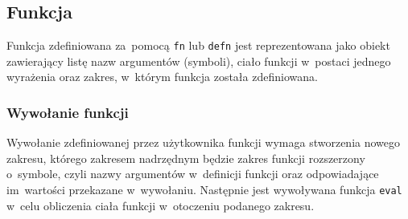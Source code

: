 \documentclass[a4paper,11pt]{article}
\begin{document}
\subsection{Funkcja}

Funkcja zdefiniowana za~pomocą \verb+fn+ lub \verb+defn+ jest reprezentowana
jako obiekt zawierający listę nazw argumentów (symboli), ciało funkcji
w~postaci jednego wyrażenia oraz zakres, w~którym funkcja została zdefiniowana.

\subsubsection{Wywołanie funkcji}

Wywołanie zdefiniowanej przez użytkownika funkcji wymaga stworzenia nowego
zakresu, którego zakresem nadrzędnym będzie zakres funkcji rozszerzony
o~symbole, czyli nazwy argumentów w~definicji funkcji oraz odpowiadające
im~wartości przekazane w~wywołaniu. Następnie jest wywoływana funkcja
\verb+eval+ w~celu obliczenia ciała funkcji w~otoczeniu podanego zakresu.
\end{document}
